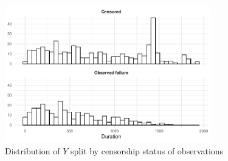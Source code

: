\documentclass[11pt]{article}
\newcommand\minp[1]{\begin{minipage}{0.8\textwidth} #1 \end{minipage}}
\begin{document}
\begin{figure}[!ht]
    \centering
    \minp{\caption{Distribution of $Y$ split by censorship status of observations} \label{fig:DVsummary}}
    \includegraphics[width = 0.8\textwidth]{figures/fig5_DVsummary.pdf}
\end{figure}
\end{document}
